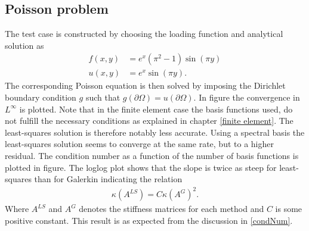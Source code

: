 \subsection{Poisson problem}
The test case is constructed by choosing the loading function and analytical solution as 
\begin{align}
	f(x,y) &=  e^{x}(\pi^2-1)\sin(\pi y)\\
	u(x,y) &=  e^{x}\sin(\pi y). %
	\label{eq:poissonTestCasevariables}
\end{align}
%
The corresponding Poisson equation is then solved by imposing the Dirichlet boundary condition $g$ such that $g(\partial \Omega) = u(\partial \Omega)$.
In figure the convergence in $L^{\infty}$ is plotted. Note that in the finite element case the basis functions used, do not fulfill the necessary conditions as explained in chapter \ref{finite element}. The least-squares solution is therefore notably less accurate. Using a spectral basis the least-squares solution seems to converge at the same rate, but to a higher residual. The condition number as a function of the number of basis functions is plotted in figure. The loglog plot shows that the slope is twice as steep for least-squares than for Galerkin indicating the relation 
%
\begin{align}
	\kappa(A^{LS})=C\kappa(A^{G})^{2}.
	\label{eq:condNumber}
\end{align}
%
Where $A^{LS}$ and $A^{G}$ denotes the stiffness matrices for each method and $C$ is some positive constant. 
 This result is as expected from the discussion in \ref{condNum}.   
%
